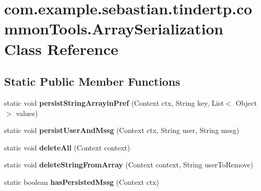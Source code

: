\hypertarget{classcom_1_1example_1_1sebastian_1_1tindertp_1_1commonTools_1_1ArraySerialization}{}\section{com.\+example.\+sebastian.\+tindertp.\+common\+Tools.\+Array\+Serialization Class Reference}
\label{classcom_1_1example_1_1sebastian_1_1tindertp_1_1commonTools_1_1ArraySerialization}
\subsection*{Static Public Member Functions}
\begin{DoxyCompactItemize}
\item 
static void {\bfseries persist\+String\+Arrayin\+Pref} (Context ctx, String key, List$<$ Object $>$ values)\hypertarget{classcom_1_1example_1_1sebastian_1_1tindertp_1_1commonTools_1_1ArraySerialization_a483304bbf70677d9e5d5462a4e9eb7ec}{}\label{classcom_1_1example_1_1sebastian_1_1tindertp_1_1commonTools_1_1ArraySerialization_a483304bbf70677d9e5d5462a4e9eb7ec}

\item 
static void {\bfseries persist\+User\+And\+Mssg} (Context ctx, String user, String mssg)\hypertarget{classcom_1_1example_1_1sebastian_1_1tindertp_1_1commonTools_1_1ArraySerialization_a78c724ccfa96d1a6c168f7a4d417acb1}{}\label{classcom_1_1example_1_1sebastian_1_1tindertp_1_1commonTools_1_1ArraySerialization_a78c724ccfa96d1a6c168f7a4d417acb1}

\item 
static void {\bfseries delete\+All} (Context context)\hypertarget{classcom_1_1example_1_1sebastian_1_1tindertp_1_1commonTools_1_1ArraySerialization_a62582fe2d3820c1e6c165f89248737f4}{}\label{classcom_1_1example_1_1sebastian_1_1tindertp_1_1commonTools_1_1ArraySerialization_a62582fe2d3820c1e6c165f89248737f4}

\item 
static void {\bfseries delete\+String\+From\+Array} (Context context, String user\+To\+Remove)\hypertarget{classcom_1_1example_1_1sebastian_1_1tindertp_1_1commonTools_1_1ArraySerialization_aec11c0960c8ad2eea8e61aee8e22b276}{}\label{classcom_1_1example_1_1sebastian_1_1tindertp_1_1commonTools_1_1ArraySerialization_aec11c0960c8ad2eea8e61aee8e22b276}

\item 
static boolean {\bfseries has\+Persisted\+Mssg} (Context ctx)\hypertarget{classcom_1_1example_1_1sebastian_1_1tindertp_1_1commonTools_1_1ArraySerialization_a00bd808527962e2a8dc4e61fa0790129}{}\label{classcom_1_1example_1_1sebastian_1_1tindertp_1_1commonTools_1_1ArraySerialization_a00bd808527962e2a8dc4e61fa0790129}


\end{DoxyCompactItemize}
